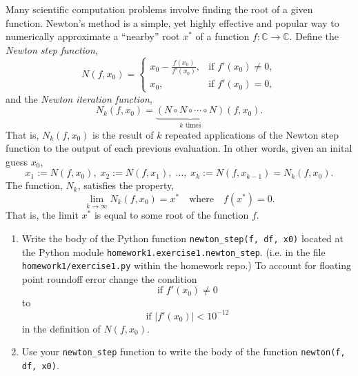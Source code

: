 \documentclass[12pt]{article}
\begin{document}
Many scientific computation problems involve finding the root of a given
function. Newton's method is a simple, yet highly effective and popular way to
numerically approximate a ``nearby'' root $x^*$ of a function $f : \mathbb{C}
\to \mathbb{C}$. Define the {\it Newton step function},
\[
  N(f, x_0) =
  \begin{cases}
    x_0 - \frac{f(x_0)}{f'(x_0)}, & \text{if } f'(x_0) \neq 0, \\
    x_0, & \text{if } f'(x_0) = 0,
  \end{cases}
\]
and the {\it Newton iteration function},
\[
  N_k(f, x_0)
  =
  \underbrace{(N \circ N \circ \cdots \circ N)}_{k \text{ times}}(f, x_0).
\]
That is, $N_k(f,x_0)$ is the result of $k$ repeated applications of the Newton
step function to the output of each previous evaluation. In other words, given
an inital guess $x_0$,
\[
  x_1 := N(f,x_0), \;
  x_2 := N(f,x_1), \;
  \ldots, \;
  x_k := N(f,x_{k-1}) = N_k(f,x_0).
\]
The function, $N_k$, satisfies the property,
\[
  \lim_{k \to \infty} N_k(f, x_0) = x^* \quad \text{where} \quad f(x^*) = 0.
\]
That is, the limit $x^*$ is equal to some root of the function $f$.

\begin{enumerate}
\item Write the body of the Python function {\tt newton\_step(f, df, x0)}
  located at the Python module {\tt homework1.exercise1.newton\_step}. (i.e. in
  the file {\tt homework1/exercise1.py} within the homework repo.) To account
  for floating point roundoff error change the condition
  \[
    \text{if } f'(x_0) \neq 0
  \]
  to
  \[
    \text{if } | f'(x_0) | < 10^{-12}
  \]
  in the definition of $N(f,x_0)$.
\item Use your \verb=newton_step= function to write the body of the function
  \verb=newton(f, df, x0)=.
\end{enumerate}
\end{document}
